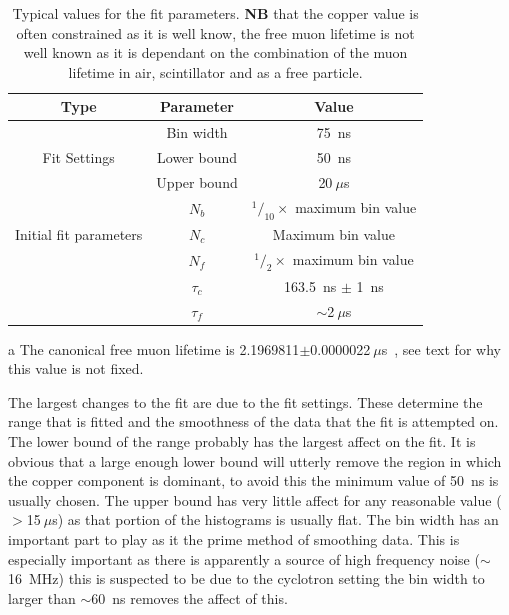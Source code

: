 \documentclass[]{article}
\newcommand{\ms}{$~\mu$s}
\begin{document}
\begin{table}
    \begin{center}
	    \begin{threeparttable}
		    \begin{tabular}{c | c | c }
		        Type & Parameter   & Value \\
		        \hline
		        \multirow{3}{*}{Fit Settings} & Bin width   & 75~ns \\
		                                      & Lower bound & 50~ns \\
		                                      & Upper bound & 20\ms \\
		        \hline
		        \multirow{3}{*}{Initial fit parameters} 
		                    & $N_{b}$     & $^1/_{10} \times$ maximum bin value \\
		                    & $N_{c}$     & Maximum bin value\\
		                    & $N_{f}$     & $^1/_{2} \times$ maximum bin value\\
		                    & $\tau_{c}$  & 163.5~ns $\pm$ 1~ns\\
		                    & $\tau_{f}$  & $\sim$2\ms\tnote{a}\\
		    \end{tabular}
		    \caption{Typical values for the fit parameters. \textbf{NB} that the copper value is often constrained as it is well know, the free muon lifetime is not well known as it is dependant on the combination of the muon lifetime in air, scintillator and as a free particle.}
		    \begin{tablenotes}
		        \item [a] The canonical free muon lifetime is 2.1969811$\pm$0.0000022\ms~\cite{Beringer2012}, see text for why this value is not fixed.
		    \end{tablenotes}
		    \label{tab:typical_fit_values}
	    \end{threeparttable}
    \end{center}
\end{table}

The largest changes to the fit are due to the fit settings. These determine the range that is fitted and the smoothness of the data that the fit is attempted on. The lower bound of the range probably has the largest affect on the fit. It is obvious that a large enough lower bound will utterly remove the region in which the copper component is dominant, to avoid this the minimum value of 50~ns is usually chosen. The upper bound has very little affect for any reasonable value ($>$15\ms) as that portion of the histograms is usually flat. The bin width has an important part to play as it the prime method of smoothing data. This is especially important as there is apparently a source of high frequency noise ($\sim$16~MHz) this is suspected to be due to the cyclotron setting the bin width to larger than $\sim$60~ns removes the affect of this.
\end{document}
